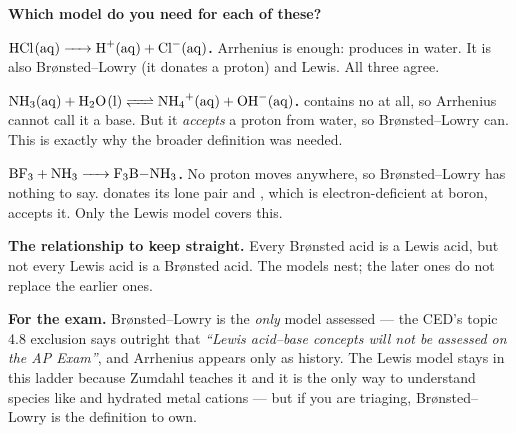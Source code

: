 \documentclass{apchem-worksheet}
\begin{document}
\begin{center}
\end{center}

\begin{workedexample}
\textbf{Which model do you need for each of these?}

\textbf{$\ce{HCl(aq) -> H+(aq) + Cl-(aq)}$.} Arrhenius is enough:
 produces  in water. It is also Br\o nsted--Lowry (it
donates a proton) and Lewis. All three agree.

\textbf{$\ce{NH3(aq) + H2O(l) <=> NH4+(aq) + OH-(aq)}$.} 
contains no  at all, so Arrhenius cannot call it a base. But it
\emph{accepts} a proton from water, so Br\o nsted--Lowry can. This is
exactly why the broader definition was needed.

\textbf{$\ce{BF3 + NH3 -> F3B-NH3}$.} No proton moves anywhere, so
Br\o nsted--Lowry has nothing to say.  donates its lone pair and
, which is electron-deficient at boron, accepts it. Only the
Lewis model covers this.

\textbf{The relationship to keep straight.} Every Br\o nsted acid is a
Lewis acid, but not every Lewis acid is a Br\o nsted acid. The models
nest; the later ones do not replace the earlier ones.

\textbf{For the exam.} Br\o nsted--Lowry is the \emph{only} model
assessed --- the CED's topic 4.8 exclusion says outright that
\emph{``Lewis acid--base concepts will not be assessed on the AP
Exam''}, and Arrhenius appears only as history. The Lewis model stays
in this ladder because Zumdahl teaches it and it is the only way to
understand species like  and hydrated metal cations --- but if
you are triaging, Br\o nsted--Lowry is the definition to own.
\end{workedexample}
\end{document}
